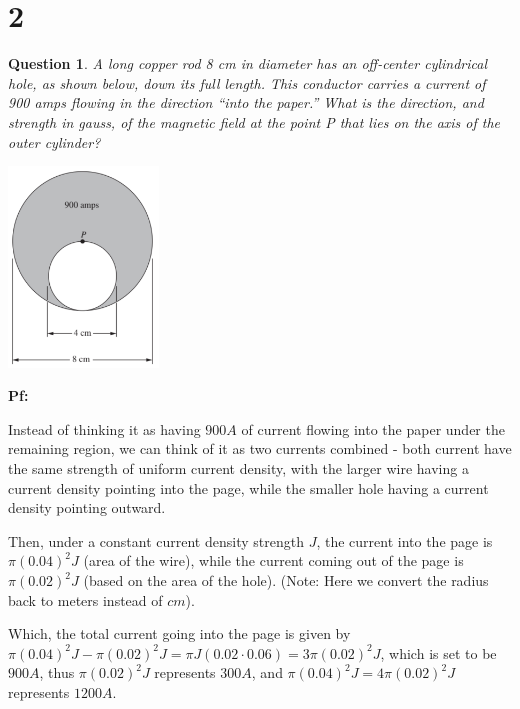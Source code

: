 \documentclass{article}
\newtheorem{question}{Question}
\begin{document}
\hfill

\hfill

\section*{2}
\begin{myBox}[]{}
    \begin{question}
        A long copper rod 8 cm in diameter has an off-center cylindrical
        hole, as shown below, down its full length. This conductor
        carries a current of 900 amps flowing in the direction “into the
        paper.” What is the direction, and strength in gauss, of the magnetic
        field at the point P that lies on the axis of the outer cylinder?
    \end{question}

    \begin{center}
        \includegraphics*[width=40mm]{Purcell 6.37.png}
    \end{center}
\end{myBox}

\textbf{Pf:}

Instead of thinking it as having $900A$ of current flowing into the paper under the remaining region,
we can think of it as two currents combined - both current have the same strength of uniform current density,
with the larger wire having a current density pointing into the page, while the smaller hole having a current density pointing outward.

Then, under a constant current density strength $J$, the current into the page is $\pi (0.04)^2 J$ (area of the wire),
while the current coming out of the page is $\pi (0.02)^2 J$ (based on the area of the hole).
(Note: Here we convert the radius back to meters instead of $cm$).

Which, the total current going into the page is given by $\pi (0.04)^2J-\pi(0.02)^2J = \pi J(0.02\cdot 0.06) = 3\pi (0.02)^2 J$, which is 
set to be $900A$, thus $\pi(0.02)^2J$ represents $300A$, and $\pi(0.04)^2J = 4\pi(0.02)^2J$ represents $1200A$.
\end{document}
